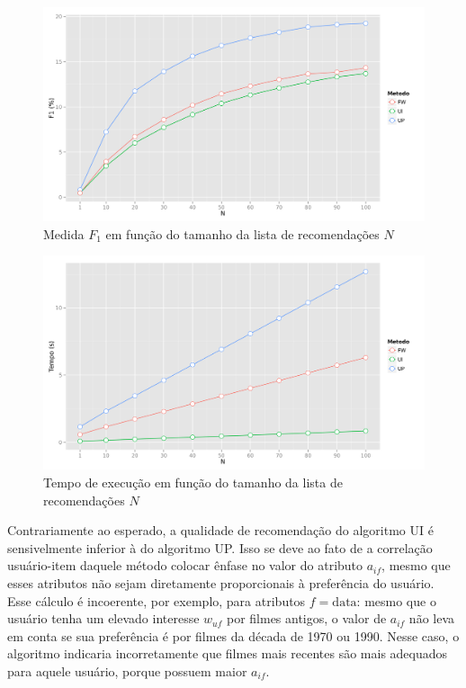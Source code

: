 \begin{figure}[htp]
    \begin{center}
    \includegraphics[width=1\textwidth]{img/F1_N}
    \end{center}
    \label{fig:F1_N}
    \caption{Medida $F_1$ em função do tamanho da lista de recomendações $N$}
\end{figure}

\begin{figure}[htp]
    \begin{center}
    \includegraphics[width=1\textwidth]{img/time_N}
    \end{center}
    \label{fig:time_N}
    \caption{Tempo de execução em função do tamanho da lista de recomendações $N$}
\end{figure}


Contrariamente ao esperado, a qualidade de recomendação do algoritmo UI é sensivelmente inferior à do algoritmo UP. Isso se deve ao fato de a correlação usuário-item daquele método colocar ênfase no valor do atributo $a_{if}$, mesmo que esses atributos não sejam diretamente proporcionais à preferência do usuário. Esse cálculo é incoerente, por exemplo, para atributos $f=\mathrm{data}$: mesmo que o usuário tenha um elevado interesse $w_{uf}$ por filmes antigos, o valor de $a_{if}$ não leva em conta se sua preferência é por filmes da década de 1970 ou 1990. Nesse caso, o algoritmo indicaria incorretamente que filmes mais recentes são mais adequados para aquele usuário, porque possuem maior $a_{if}$.

